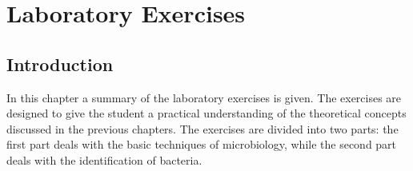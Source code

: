 \chapter{Laboratory Exercises}
\setlength{\headheight}{12.71342pt}
\addtolength{\topmargin}{-0.71342pt}

\section*{Introduction}
In this chapter a summary of the laboratory exercises is given. The exercises are designed to give the student a practical understanding of the theoretical concepts discussed in the previous chapters. The exercises are divided into two parts: the first part deals with the basic techniques of microbiology, while the second part deals with the identification of bacteria. 
